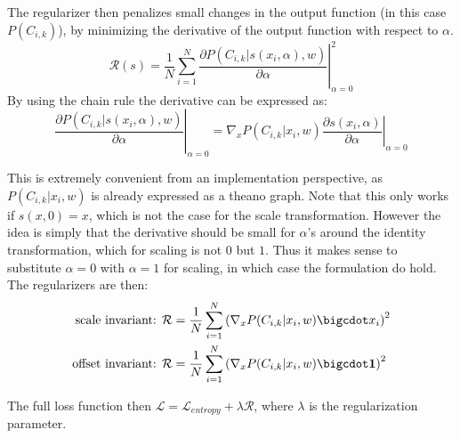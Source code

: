 The regularizer then penalizes small changes in the output function (in this case $P(C_{i, k})$), by minimizing the derivative of the output function with respect to $\alpha$.
\begin{equation}
\mathcal{R}(s) = \frac{1}{N} \sum_{i=1}^N \left. \frac{\partial P(C_{i, k} | s(x_i, \alpha), w)}{\partial \alpha} \right|^2_{\alpha=0}
\end{equation}
By using the chain rule the derivative can be expressed as:
\begin{equation*}
\left. \frac{\partial P(C_{i, k} | s(x_i, \alpha), w)}{\partial \alpha} \right|_{\alpha=0} = \left.\nabla_x P(C_{i, k} | x_i, w) \frac{\partial s(x_i, \alpha)}{\partial \alpha} \right|_{\alpha=0}
\end{equation*}

This is extremely convenient from an implementation perspective, as $P(C_{i, k} | x_i, w)$ is already expressed as a theano graph. Note that this only works if $s(x, 0) = x$, which is not the case for the scale transformation. However the idea is simply that the derivative should be small for $\alpha$'s around the identity transformation, which for scaling is not $0$ but $1$. Thus it makes sense to substitute $\alpha = 0$ with $\alpha = 1$ for scaling, in which case the formulation do hold. The regularizers are then:
\begin{align}
\text{scale invariant: }& \mathcal{R} = \frac{1}{N} \sum_{i=1}^N \left(\nabla_x P(C_{i, k} | x_i, w) \bigcdot x_i\right)^2 \\
\text{offset invariant: }& \mathcal{R} = \frac{1}{N} \sum_{i=1}^N \left(\nabla_x P(C_{i, k} | x_i, w) \bigcdot \mathbf{1}\right)^2
\end{align}

The full loss function then $\mathcal{L} = \mathcal{L}_{entropy} + \lambda \mathcal{R}$, where $\lambda$ is the regularization parameter.
